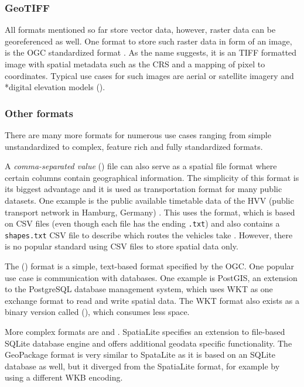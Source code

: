 		\subsubsection{GeoTIFF}
		
			All formats mentioned so far store vector data, however, raster data can be georeferenced as well.
			One format to store such raster data in form of an image, is the OGC standardized  format \cite{ogc-geotiff}.
			As the name suggests, it is an TIFF formatted image with spatial metadata such as the CRS and a mapping of pixel to coordinates.
			Typical use cases for such images are aerial or satellite imagery and *{digital elevation models} ().
		
		\subsubsection{Other formats}
		
			There are many more formats for numerous use cases ranging from simple unstandardized to complex, feature rich and fully standardized formats.
			
			A \emph{comma-separated value} () file can also serve as a spatial file format where certain columns contain geographical information.
			The simplicity of this format is its biggest advantage and it is used as transportation format for many public datasets.
			One example is the public available timetable data of the HVV (public transport network in Hamburg, Germany) \cite{hvv-fahrplandaten}.
			This uses the  format, which is based on CSV files (even though each file has the ending \texttt{.txt}) and also contains a \texttt{shapes.txt} CSV file to describe which routes the vehicles take \cite{google-gtfs}.
			However, there is no popular standard using CSV files to store spatial data only.
			
			The  () format is a simple, text-based format specified by the OGC\cite[51]{ogc-sfa}.
			One popular use case is communication with databases.
			One example is PostGIS, an extension to the PostgreSQL database management system, which uses WKT as one exchange format to read and write spatial data\cite{postgis-doc-wkt}.
			The WKT format also exists as a binary version called  (), which consumes less space.
			
			More complex formats are  and .
			SpatiaLite specifies an extension to file-based SQLite database engine and offers additional geodata specific functionality\cite{spatialite-website}.
			The GeoPackage format is very similar to SpataLite as it is based on an SQLite database as well, but it diverged from the SpatiaLite format, for example by using a different WKB encoding\cite{geopackage-faq}.
			
